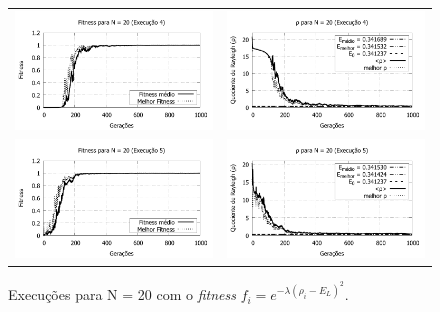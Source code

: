 \begin{figure}[p]
\begin{tabular}{@{}cc@{}}
		\includegraphics[width=.40\textwidth]{figs/resultados/fitnessEL/N-20_E-4_fitness-extendido.pdf} &
    \includegraphics[width=.40\textwidth]{figs/resultados/fitnessEL/N-20_E-4_rho_extendido.pdf} \\
		\includegraphics[width=.40\textwidth]{figs/resultados/fitnessEL/N-20_E-5_fitness-extendido.pdf} &
    \includegraphics[width=.40\textwidth]{figs/resultados/fitnessEL/N-20_E-5_rho_extendido.pdf}
  \end{tabular}
  \caption{Execuções para N = 20 com o \textit{fitness} $f_i = e^{-\lambda(\rho_i - E_L)^2}$.}
	\label{fig:execucoes_N20_EL}
	\end{figure}
	
